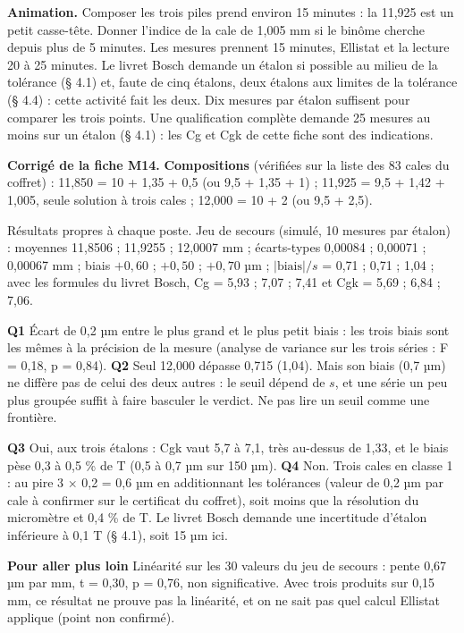 \textbf{Animation.} Composer les trois piles prend environ 15 minutes : la 11,925 est un petit casse-tête. Donner l'indice de la cale de 1,005 mm si le binôme cherche depuis plus de 5 minutes. Les mesures prennent 15 minutes, Ellistat et la lecture 20 à 25 minutes. Le livret Bosch demande un étalon si possible au milieu de la tolérance (§ 4.1) et, faute de cinq étalons, deux étalons aux limites de la tolérance (§ 4.4) : cette activité fait les deux. Dix mesures par étalon suffisent pour comparer les trois points. Une qualification complète demande 25 mesures au moins sur un étalon (§ 4.1) : les Cg et Cgk de cette fiche sont des indications.\par
\textbf{\color{ok}Corrigé de la fiche M14.} \textbf{Compositions} (vérifiées sur la liste des 83 cales du coffret) : 11,850 = 10 + 1,35 + 0,5 (ou 9,5 + 1,35 + 1) ; 11,925 = 9,5 + 1,42 + 1,005, seule solution à trois cales ; 12,000 = 10 + 2 (ou 9,5 + 2,5).\par Résultats propres à chaque poste. Jeu de secours (simulé, 10 mesures par étalon) : moyennes 11,8506 ; 11,9255 ; 12,0007 mm ; écarts-types 0,00084 ; 0,00071 ; 0,00067 mm ; biais $+0{,}60$ ; $+0{,}50$ ; $+0{,}70$ µm ; $|\text{biais}| / s$ = 0,71 ; 0,71 ; 1,04 ; avec les formules du livret Bosch, Cg = 5,93 ; 7,07 ; 7,41 et Cgk = 5,69 ; 6,84 ; 7,06.\par \textbf{Q1} Écart de 0,2 µm entre le plus grand et le plus petit biais : les trois biais sont les mêmes à la précision de la mesure (analyse de variance sur les trois séries : F = 0,18, p = 0,84). \textbf{Q2} Seul 12,000 dépasse 0,715 (1,04). Mais son biais (0,7 µm) ne diffère pas de celui des deux autres : le seuil dépend de $s$, et une série un peu plus groupée suffit à faire basculer le verdict. Ne pas lire un seuil comme une frontière.\par \textbf{Q3} Oui, aux trois étalons : Cgk vaut 5,7 à 7,1, très au-dessus de 1,33, et le biais pèse 0,3 à 0,5 \% de T (0,5 à 0,7 µm sur 150 µm). \textbf{Q4} Non. Trois cales en classe 1 : au pire 3 × 0,2 = 0,6 µm en additionnant les tolérances (valeur de 0,2 µm par cale à confirmer sur le certificat du coffret), soit moins que la résolution du micromètre et 0,4 \% de T. Le livret Bosch demande une incertitude d'étalon inférieure à 0,1 T (§ 4.1), soit 15 µm ici.\par \textbf{Pour aller plus loin} Linéarité sur les 30 valeurs du jeu de secours : pente 0,67 µm par mm, t = 0,30, p = 0,76, non significative. Avec trois produits sur 0,15 mm, ce résultat ne prouve pas la linéarité, et on ne sait pas quel calcul Ellistat applique (point non confirmé).\par
